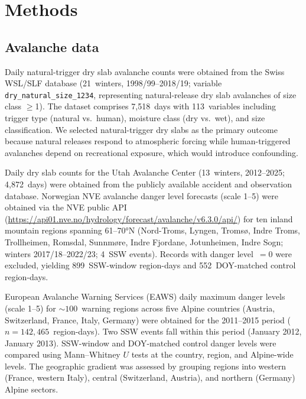 \documentclass[11pt,letterpaper]{article}
\begin{document}
\section*{Methods}

\subsection*{Avalanche data}

Daily natural-trigger dry slab avalanche counts were obtained from the Swiss WSL/SLF database (21~winters, 1998/99--2018/19; variable \texttt{dry\_natural\_size\_1234}, representing natural-release dry slab avalanches of size class $\geq$1). The dataset comprises 7,518~days with 113~variables including trigger type (natural vs.\ human), moisture class (dry vs.\ wet), and size classification. We selected natural-trigger dry slabs as the primary outcome because natural releases respond to atmospheric forcing while human-triggered avalanches depend on recreational exposure, which would introduce confounding.

Daily dry slab counts for the Utah Avalanche Center (13~winters, 2012--2025; 4,872~days) were obtained from the publicly available accident and observation database. Norwegian NVE avalanche danger level forecasts (scale 1--5) were obtained via the NVE public API (\url{https://api01.nve.no/hydrology/forecast/avalanche/v6.3.0/api/}) for ten inland mountain regions spanning 61--70°N (Nord-Troms, Lyngen, Tromsø, Indre Troms, Trollheimen, Romsdal, Sunnmøre, Indre Fjordane, Jotunheimen, Indre Sogn; winters 2017/18--2022/23; 4~SSW events). Records with danger level~$= 0$ were excluded, yielding 899~SSW-window region-days and 552~DOY-matched control region-days.

European Avalanche Warning Services (EAWS) daily maximum danger levels (scale 1--5) for ${\sim}100$~warning regions across five Alpine countries (Austria, Switzerland, France, Italy, Germany) were obtained for the 2011--2015 period ($n = 142{,}465$~region-days). Two SSW events fall within this period (January 2012, January 2013). SSW-window and DOY-matched control danger levels were compared using Mann--Whitney $U$ tests at the country, region, and Alpine-wide levels. The geographic gradient was assessed by grouping regions into western (France, western Italy), central (Switzerland, Austria), and northern (Germany) Alpine sectors.
\end{document}
